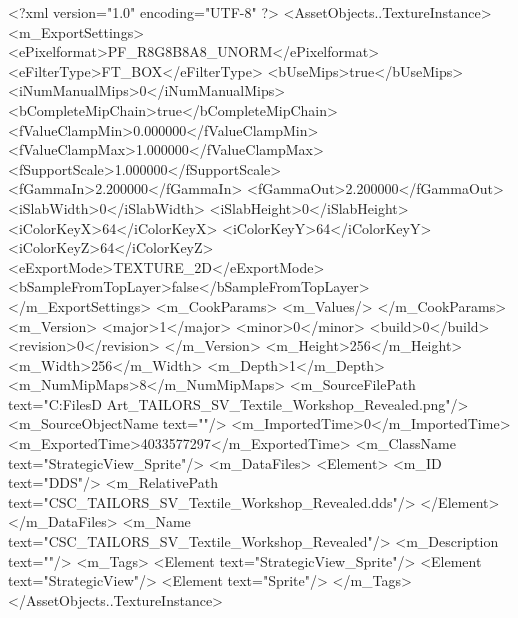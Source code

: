<?xml version="1.0" encoding="UTF-8" ?>
<AssetObjects..TextureInstance>
	<m_ExportSettings>
		<ePixelformat>PF_R8G8B8A8_UNORM</ePixelformat>
		<eFilterType>FT_BOX</eFilterType>
		<bUseMips>true</bUseMips>
		<iNumManualMips>0</iNumManualMips>
		<bCompleteMipChain>true</bCompleteMipChain>
		<fValueClampMin>0.000000</fValueClampMin>
		<fValueClampMax>1.000000</fValueClampMax>
		<fSupportScale>1.000000</fSupportScale>
		<fGammaIn>2.200000</fGammaIn>
		<fGammaOut>2.200000</fGammaOut>
		<iSlabWidth>0</iSlabWidth>
		<iSlabHeight>0</iSlabHeight>
		<iColorKeyX>64</iColorKeyX>
		<iColorKeyY>64</iColorKeyY>
		<iColorKeyZ>64</iColorKeyZ>
		<eExportMode>TEXTURE_2D</eExportMode>
		<bSampleFromTopLayer>false</bSampleFromTopLayer>
	</m_ExportSettings>
	<m_CookParams>
		<m_Values/>
	</m_CookParams>
	<m_Version>
		<major>1</major>
		<minor>0</minor>
		<build>0</build>
		<revision>0</revision>
	</m_Version>
	<m_Height>256</m_Height>
	<m_Width>256</m_Width>
	<m_Depth>1</m_Depth>
	<m_NumMipMaps>8</m_NumMipMaps>
	<m_SourceFilePath text="C:\Users\Shadow\Desktop\Working Files\2D Art\Quarters\Tailors\StrategicView\CSC_TAILORS_SV_Textile_Workshop_Revealed.png"/>
	<m_SourceObjectName text=""/>
	<m_ImportedTime>0</m_ImportedTime>
	<m_ExportedTime>4033577297</m_ExportedTime>
	<m_ClassName text="StrategicView_Sprite"/>
	<m_DataFiles>
		<Element>
			<m_ID text="DDS"/>
			<m_RelativePath text="CSC_TAILORS_SV_Textile_Workshop_Revealed.dds"/>
		</Element>
	</m_DataFiles>
	<m_Name text="CSC_TAILORS_SV_Textile_Workshop_Revealed"/>
	<m_Description text=""/>
	<m_Tags>
		<Element text="StrategicView_Sprite"/>
		<Element text="StrategicView"/>
		<Element text="Sprite"/>
	</m_Tags>
</AssetObjects..TextureInstance>

